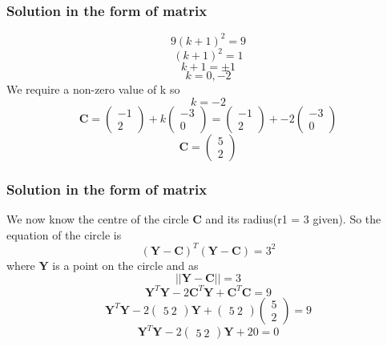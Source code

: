 \documentclass{beamer}
\begin{document}
\begin{frame}
\frametitle{Solution in the form of matrix}
$$ 9(k+1)^2 = 9 $$
$$ (k+1)^2 = 1 $$
$$ k + 1 = \pm 1 $$
$$ k = 0,-2  $$ 
We require a non-zero value of k so $$k = -2$$
$$ \textbf{C} = \begin{pmatrix}-1\\ 2 \end{pmatrix} + k\begin{pmatrix}-3\\ 0 \end{pmatrix} = \begin{pmatrix}-1\\ 2 \end{pmatrix} + -2\begin{pmatrix}-3\\ 0 \end{pmatrix} $$ 
$$\textbf{C} = \begin{pmatrix}5\\ 2 \end{pmatrix}$$
\end{frame}

\begin{frame}
\frametitle{Solution in the form of matrix}
We now know the centre of the circle \textbf{C} and its radius(r1 = 3 given). So the equation of the circle is 
$$(\textbf{Y} - \textbf{C})^T(\textbf{Y} - \textbf{C}) = 3^2 $$
where \textbf{Y} is a point on the circle and as $$||\textbf{Y} - \textbf{C}|| = 3$$
$$\textbf{Y}^T\textbf{Y} - 2\textbf{C}^T\textbf{Y} + \textbf{C}^T\textbf{C} = 9 $$
$$\textbf{Y}^T\textbf{Y} - 2\begin{pmatrix}5\ 2 \end{pmatrix}\textbf{Y} + \begin{pmatrix}5\ 2 \end{pmatrix}\begin{pmatrix}5\\ 2 \end{pmatrix} = 9 $$
\begin{equation}
\textbf{Y}^T\textbf{Y} - 2\begin{pmatrix}5\ 2 \end{pmatrix}\textbf{Y} + 20 = 0 
\end{equation}
\end{frame}
\end{document}

